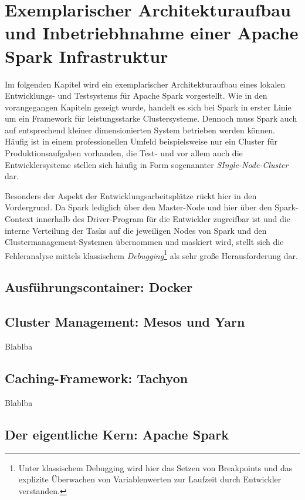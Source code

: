 \chapter{Exemplarischer Architekturaufbau und Inbetriebhnahme einer Apache Spark Infrastruktur }
\label{chapter:architektur}



Im folgenden Kapitel wird ein exemplarischer Architekturaufbau eines lokalen Entwicklungs- und Testsystems für Apache Spark vorgestellt. Wie in den vorangegangen Kapiteln gezeigt wurde, handelt es sich bei Spark in erster Linie um ein Framework für leistungsstarke Clustersysteme. Dennoch muss Spark auch auf entsprechend kleiner dimensionierten System betrieben werden können. Häufig ist in einem professionellen Umfeld beispielsweise nur ein Cluster für Produktionsaufgaben vorhanden, die Test- und vor allem auch die Entwicklersysteme stellen sich häufig in Form sogenannter \textit{SIngle-Node-Cluster} dar. 

Besonders der Aspekt der Entwicklungsarbeitsplätze rückt hier in den Vordergrund. Da Spark lediglich über den Master-Node und hier über den Spark-Context innerhalb des Driver-Program für die Entwickler zugreifbar ist und die interne Verteilung der Tasks auf die jeweiligen Nodes von Spark und den Clustermanagement-Systemen übernommen und maskiert wird, stellt sich die Fehleranalyse mittels klassischem \textit{Debugging}\footnote{Unter klassischem Debugging wird hier das Setzen von Breakpoints und das explizite Überwachen von Variablenwerten zur Laufzeit durch Entwickler verstanden.} als sehr große Herausforderung dar. 

\section{Ausführungscontainer: Docker}
\label{section:docker}

\section{Cluster Management: Mesos und Yarn }
\label{section:mesos}

Blablba

\section{Caching-Framework: Tachyon}
\label{section:tachyon}

Blablba

\section{Der eigentliche Kern: Apache Spark}
\label{section:kern}

